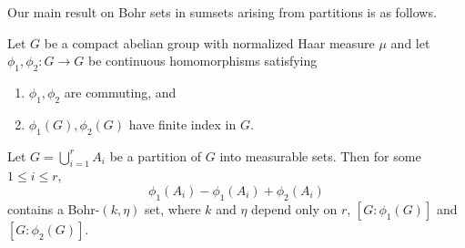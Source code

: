 Our main result on Bohr sets in sumsets arising from partitions is as follows. 


\begin{theorem} \label{th:main-partition}
Let $G$ be a compact abelian group with normalized Haar measure $\mu$ and let $\phi_1, \phi_2: G \rightarrow G$ be continuous homomorphisms satisfying
\begin{enumerate}[label=(\alph*), leftmargin=*]
\item $\phi_1, \phi_2$ are commuting, and
\item $\phi_1(G), \phi_2(G)$ have finite index in $G$.
\end{enumerate} 
Let $G = \bigcup_{i=1}^r A_i$ be a partition of $G$ into measurable sets. Then for some $1 \leq i \leq r$, 
\[
\phi_1(A_i) - \phi_1(A_i) + \phi_2(A_i)
\] 
contains a Bohr-$(k, \eta)$ set, where $k$ and $\eta$ depend only on $r$, $[G:\phi_1(G)]$ and $[G:\phi_2(G)]$.
\end{theorem}
